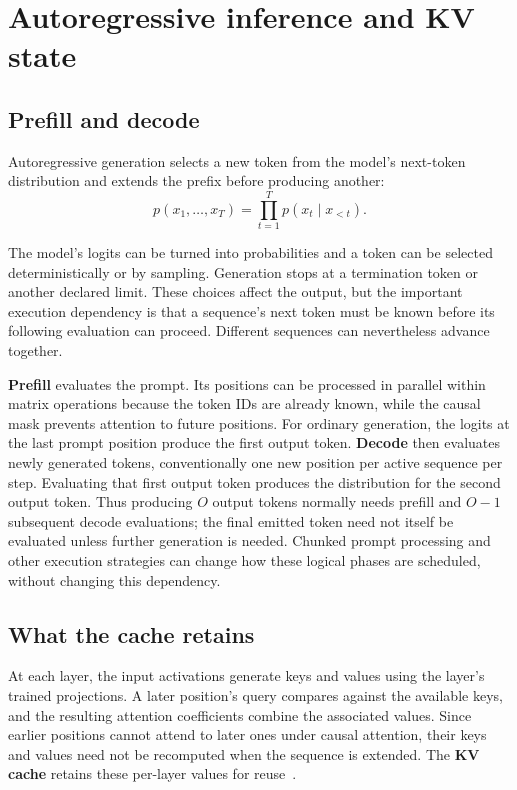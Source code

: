\section{Autoregressive inference and KV state}
\label{sec:autoregressive-kv}

\subsection{Prefill and decode}

Autoregressive generation selects a new token from the model's
next-token distribution and extends the prefix before producing another:
\begin{equation}
\label{eq:autoregressive-factorization}
 p(x_1,\ldots,x_T)=\prod_{t=1}^{T}p(x_t\mid x_{<t}).
\end{equation}

The model's logits can be turned into probabilities and a token can be
selected deterministically or by sampling.  Generation stops at a
termination token or another declared limit.  These choices affect the
output, but the important execution dependency is that a sequence's
next token must be known before its following evaluation can proceed.
Different sequences can nevertheless advance together.

\textbf{Prefill} evaluates the prompt.  Its positions can be processed
in parallel within matrix operations because the token IDs are already
known, while the causal mask prevents attention to future positions.
For ordinary generation, the logits at the last prompt position produce
the first output token.  \textbf{Decode} then evaluates newly generated
tokens, conventionally one new position per active sequence per step.
Evaluating that first output token produces the distribution for the
second output token.  Thus producing \(O\) output tokens normally needs
prefill and \(O-1\) subsequent decode evaluations; the final emitted
token need not itself be evaluated unless further generation is needed.
Chunked prompt processing and other execution strategies can change how
these logical phases are scheduled, without changing this dependency.

\subsection{What the cache retains}

At each layer, the input activations generate keys and values using the
layer's trained projections.  A later position's query compares against
the available keys, and the resulting attention coefficients combine
the associated values.  Since earlier positions cannot attend to later
ones under causal attention, their keys and values need not be recomputed
when the sequence is extended.  The \textbf{KV cache} retains these
per-layer values for reuse~\cite{pope2023efficient}.

